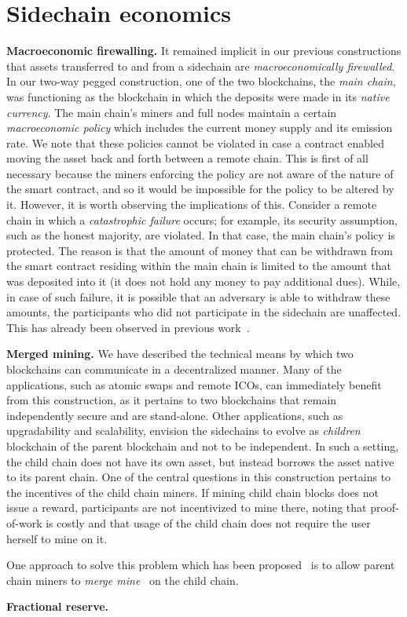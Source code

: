 \section{Sidechain economics}

\noindent
\textbf{Macroeconomic firewalling. }
It remained implicit in our previous constructions that assets transferred to
and from a sidechain are \emph{macroeconomically firewalled}. In our two-way
pegged construction, one of the two blockchains, the \emph{main chain}, was
functioning as the blockchain in which the deposits were made in its
\emph{native currency}. The main chain's miners and full nodes maintain a
certain \emph{macroeconomic policy} which includes the current money supply and
its emission rate. We note that these policies cannot be violated in case a
contract enabled moving the asset back and forth between a remote chain. This is
first of all necessary because the miners enforcing the policy are not aware of
the nature of the smart contract, and so it would be impossible for the policy
to be altered by it. However, it is worth observing the implications of this.
Consider a remote chain in which a \emph{catastrophic failure} occurs; for
example, its security assumption, such as the honest majority, are violated. In
that case, the main chain's policy is protected. The reason is that the amount
of money that can be withdrawn from the smart contract residing within the main
chain is limited to the amount that was deposited into it (it does not hold any
money to pay additional dues). While, in case of such failure, it is possible
that an adversary is able to withdraw these amounts, the participants who did
not participate in the sidechain are unaffected. This has already been observed
in previous work~\cite{sidechains}.

\noindent
\textbf{Merged mining. }
We have described the technical means by which two blockchains can communicate
in a decentralized manner. Many of the applications, such as atomic swaps and
remote ICOs, can immediately benefit from this construction, as it pertains to
two blockchains that remain independently secure and are stand-alone. Other
applications, such as upgradability and scalability, envision the sidechains to
evolve as \emph{children} blockchain of the parent blockchain and not to be
independent. In such a setting, the child chain does not have its own asset, but
instead borrows the asset native to its parent chain. One of the central
questions in this construction pertains to the incentives of the child chain
miners. If mining child chain blocks does not issue a reward, participants are
not incentivized to mine there, noting that proof-of-work is costly and that
usage of the child chain does not require the user herself to mine on it.

One approach to solve this problem which has been proposed~\cite{sidechains} is
to allow parent chain miners to \emph{merge mine}~\cite{blockstack} on the child
chain. %

\noindent
\textbf{Fractional reserve. }
